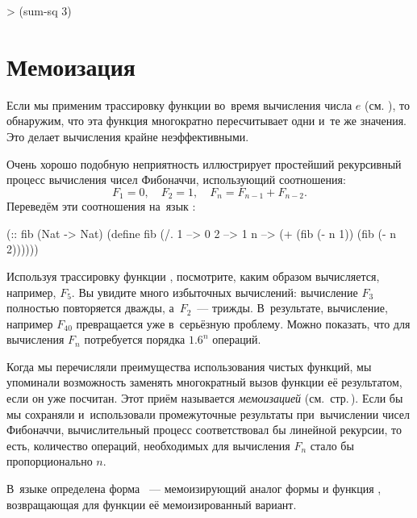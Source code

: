 \begin{SchemeCode}
   > (sum-sq 3)
\end{SchemeCode}

\vspace{-\bigskipamount}
\section[2]{Мемоизация}%
Если мы применим трассировку функции  во~время вычисления числа $e$ (см. ), то обнаружим, что эта функция многократно пересчитывает одни и~те же значения. Это делает вычисления крайне неэффективными.

Очень хорошо подобную неприятность иллюстрирует простейший рекурсивный процесс вычисления чисел Фибоначчи, использующий соотношения:
$$
F_1 = 0,\quad
F_2 = 1,\quad
F_n = F_{n-1} + F_{n-2}.
$$
Переведём эти соотношения на~язык \Scheme:

\begin{Definition}[emph=n]
(:: fib  (Nat -> Nat)
  (define fib
    (/. 1 --> 0
        2 --> 1
        n --> (+ (fib (- n 1)) 
                 (fib (- n 2))))))
\end{Definition}

Используя трассировку функции , посмотрите, каким образом вычисляется, например, $F_5$. Вы увидите много избыточных вычислений: вычисление $F_3$ полностью повторяется дважды, а~$F_2$~--- трижды. В~результате, вычисление, например $F_{40}$ превращается уже в~серьёзную проблему. Можно показать, что для вычисления $F_n$ потребуется порядка $1.6^n$ операций.

Когда мы перечисляли преимущества использования чистых функций, мы упоминали возможность заменять многократный вызов функции её результатом, если он уже посчитан. Этот приём называется \emph{мемоизацией} (см.~стр.\,\pageref{memo1}). Если бы мы сохраняли и~использовали промежуточные результаты при~вычислении чисел Фибоначчи, вычислительный процесс соответствовал бы линейной рекурсии, то есть, количество операций, необходимых для вычисления $F_n$ стало бы пропорционально $n$.

В~языке \Scheme определена форма ~--- мемоизирующий аналог формы  и функция , возвращающая для функции её мемоизированный вариант.

